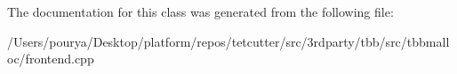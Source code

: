 The documentation for this class was generated from the following file\+:\begin{DoxyCompactItemize}
\item 
/\+Users/pourya/\+Desktop/platform/repos/tetcutter/src/3rdparty/tbb/src/tbbmalloc/frontend.\+cpp\end{DoxyCompactItemize}
